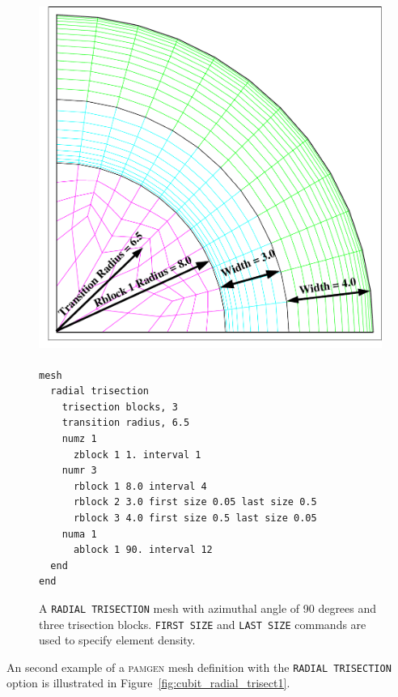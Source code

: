\begin{figure}[!thbp]
\centering
  \hfil
  \begin{minipage}[c]{1.0\linewidth}
    \centering
      \includegraphics[width=5.5in,height=4.5in]{figures/cubit_tris_rad_grad_trans}
{\ttfamily \begin{verbatim}
mesh
  radial trisection
    trisection blocks, 3
    transition radius, 6.5
    numz 1
      zblock 1 1. interval 1
    numr 3
      rblock 1 8.0 interval 4
      rblock 2 3.0 first size 0.05 last size 0.5
      rblock 3 4.0 first size 0.5 last size 0.05
    numa 1
      ablock 1 90. interval 12
  end
end
\end{verbatim}}
  \end{minipage}
  \caption [A \texttt{RADIAL TRISECTION} mesh with three trisection blocks.]{A \texttt{RADIAL TRISECTION} mesh with azimuthal
    angle of 90 degrees and three trisection blocks. \texttt{FIRST
      SIZE} and \texttt{LAST SIZE} commands are used to specify
    element density.}
  \label{fig:cubit_radial_trisect3}
\end{figure}

An second example of a \textsc{pamgen} mesh definition with the
\texttt{RADIAL TRISECTION} option is illustrated in
Figure~\ref{fig:cubit_radial_trisect1}.

